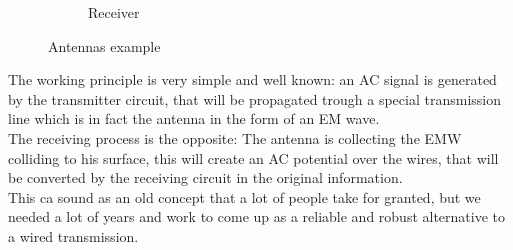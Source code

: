 \begin{figure}[H]
\begin{subfigure}[b]{0.45\textwidth}
{ }   
        \caption{Receiver}
    \end{subfigure}\caption{Antennas example}\label{fig:antennas_example}
\end{figure}
The working principle is very simple and well known: an AC signal is generated by the transmitter circuit, that will be propagated trough a special transmission line which is in fact the antenna in the form of an EM wave.\\
The receiving process is the opposite: The antenna is collecting the EMW colliding to his surface, this will create an AC potential over the wires, that will be converted by the receiving circuit in the original information.\\
This ca sound as an old concept that a lot of people take for granted, but we needed a lot of years and work to come up as a reliable and robust alternative to a wired transmission.
